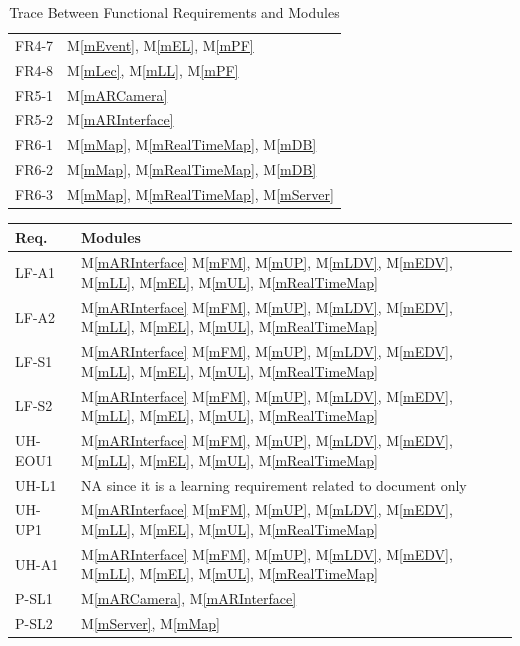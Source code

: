 \documentclass[12pt, titlepage]{article}
\newcommand{\mref}[1]{M\ref{#1}}
\begin{document}
\begin{table}[H]
\begin{tabular}{p{} p{}}
FR4-7 & \mref{mEvent}, \mref{mEL}, \mref{mPF}\\
FR4-8 & \mref{mLec}, \mref{mLL}, \mref{mPF}\\
FR5-1 & \mref{mARCamera}\\
FR5-2 & \mref{mARInterface}\\
FR6-1 & \mref{mMap}, \mref{mRealTimeMap}, \mref{mDB}\\
FR6-2 & \mref{mMap}, \mref{mRealTimeMap}, \mref{mDB}\\
FR6-3 & \mref{mMap}, \mref{mRealTimeMap}, \mref{mServer}\\
\bottomrule
\end{tabular}
\caption{Trace Between Functional Requirements and Modules}
\label{TblFRT}
\end{table}

\begin{table}[H]
\centering
\begin{tabular}{p{} p{}}
\toprule
\textbf{Req.} & \textbf{Modules}\\
\midrule
LF-A1 & \mref{mARInterface} \mref{mFM}, \mref{mUP}, \mref{mLDV}, \mref{mEDV}, \mref{mLL}, \mref{mEL}, \mref{mUL}, \mref{mRealTimeMap}\\
LF-A2 & \mref{mARInterface} \mref{mFM}, \mref{mUP}, \mref{mLDV}, \mref{mEDV}, \mref{mLL}, \mref{mEL}, \mref{mUL}, \mref{mRealTimeMap}\\
LF-S1 & \mref{mARInterface} \mref{mFM}, \mref{mUP}, \mref{mLDV}, \mref{mEDV}, \mref{mLL}, \mref{mEL}, \mref{mUL}, \mref{mRealTimeMap}\\
LF-S2 & \mref{mARInterface} \mref{mFM}, \mref{mUP}, \mref{mLDV}, \mref{mEDV}, \mref{mLL}, \mref{mEL}, \mref{mUL}, \mref{mRealTimeMap}\\
UH-EOU1 & \mref{mARInterface} \mref{mFM}, \mref{mUP}, \mref{mLDV}, \mref{mEDV}, \mref{mLL}, \mref{mEL}, \mref{mUL}, \mref{mRealTimeMap}\\
UH-L1 & NA since it is a learning requirement related to document only\\
UH-UP1 & \mref{mARInterface} \mref{mFM}, \mref{mUP}, \mref{mLDV}, \mref{mEDV}, \mref{mLL}, \mref{mEL}, \mref{mUL}, \mref{mRealTimeMap}\\
UH-A1 & \mref{mARInterface} \mref{mFM}, \mref{mUP}, \mref{mLDV}, \mref{mEDV}, \mref{mLL}, \mref{mEL}, \mref{mUL}, \mref{mRealTimeMap}\\
P-SL1 & \mref{mARCamera}, \mref{mARInterface}\\
P-SL2 & \mref{mServer}, \mref{mMap}\\

\end{tabular}
\end{table}
\end{document}
